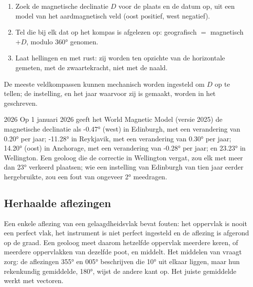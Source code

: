 \begin{method}\label{met:b1:field-lab-methods-1:declination}
\begin{enumerate}
  \item Zoek de magnetische declinatie $D$ voor de plaats en de datum op, uit een model van het aardmagnetisch veld
        (oost positief, west negatief).
  \item Tel die bij elk  dat op het kompas is afgelezen op: geografisch  $=$ magnetisch  $+ D$,
        modulo \ang{360} genomen.
  \item Laat hellingen en  met rust: zij worden ten opzichte van de horizontale gemeten, met de zwaartekracht,
        niet met de naald.
\end{enumerate}
De meeste veldkompassen kunnen mechanisch worden ingesteld om $D$ op te tellen; de instelling, en het jaar waarvoor zij is
gemaakt, worden in het  geschreven.
\end{method}

\begin{dated}{2026}
Op 1 januari 2026 geeft het World Magnetic Model (versie 2025) de magnetische declinatie als \ang{-0.47} (west) in Edinburgh,
met een verandering van \ang{+0.20} per jaar; \ang{-11.28} in Reykjavik, met een verandering van \ang{+0.30} per jaar;
\ang{+14.20} (oost) in Anchorage, met een verandering van \ang{-0.28} per jaar; en \ang{+23.23} in Wellington. Een geoloog die
de correctie in Wellington vergat, zou elk  met meer dan \ang{23} verkeerd plaatsen; wie een instelling van Edinburgh van
tien jaar eerder hergebruikte, zou een fout van ongeveer \ang{2} meedragen.
\end{dated}

\subsection{Herhaalde aflezingen}

Een enkele aflezing van een gelaagdheidsvlak bevat fouten: het oppervlak is nooit een perfect vlak, het instrument is niet
perfect ingesteld en de aflezing is afgerond op de graad. Een geoloog meet daarom hetzelfde oppervlak meerdere keren, of
meerdere oppervlakken van dezelfde poot, en middelt. Het middelen van  vraagt zorg: de aflezingen \ang{355} en
\ang{005} beschrijven  die \ang{10} uit elkaar liggen, maar hun rekenkundig gemiddelde, \ang{180}, wijst de andere
kant op. Het juiste gemiddelde werkt met vectoren.

